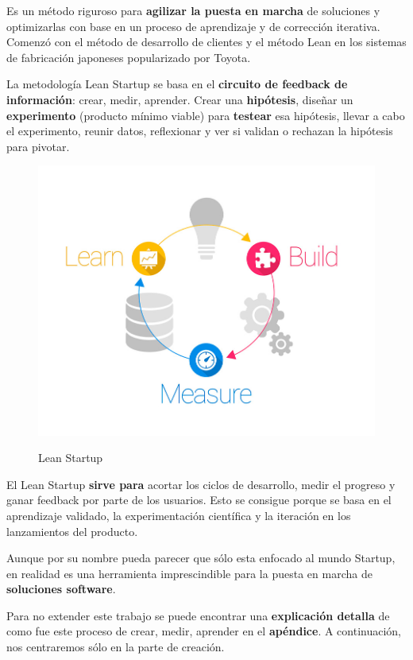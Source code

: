 \documentclass[12pt,twoside,titlepage]{report}
\begin{document}
Es un método riguroso para \textbf{agilizar la puesta en marcha} de soluciones y optimizarlas con base en un proceso de aprendizaje y de corrección iterativa. Comenzó con el método de desarrollo de clientes y el método Lean en los sistemas de fabricación japoneses popularizado por Toyota.

La metodología Lean Startup se basa en el \textbf{circuito de feedback de información}: crear, medir, aprender. Crear una \textbf{hipótesis}, diseñar un \textbf{experimento} (producto mínimo viable) para \textbf{testear} esa hipótesis, llevar a cabo el experimento, reunir datos, reflexionar y ver si validan o rechazan la hipótesis para pivotar.

\begin{figure}[H]
    \centering
    \includegraphics[scale=0.3]{Lean Startup/CircuitoFeedback}
    \label{fig:LeanStartup}
    \caption{Lean Startup}
\end{figure}

El Lean Startup \textbf{sirve para} acortar los ciclos de desarrollo, medir el progreso y ganar feedback por parte de los usuarios. Esto se consigue porque se basa en el aprendizaje validado, la experimentación científica y la iteración en los lanzamientos del producto. 

Aunque por su nombre pueda parecer que sólo esta enfocado al mundo Startup, en realidad es una herramienta imprescindible para la puesta en marcha de \textbf{soluciones software}. 

Para no extender este trabajo se puede encontrar una \textbf{explicación detalla} de como fue este proceso de crear, medir, aprender en el \textbf{apéndice}. A continuación, nos centraremos sólo en la parte de creación.
\end{document}
